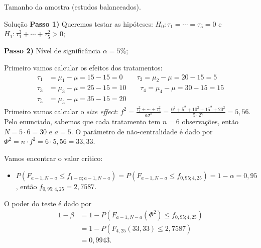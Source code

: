 \documentclass[8pt]{beamer}
\begin{document}
\begin{frame}{Tamanho da amostra (estudos balanceados).}

\small
\begin{block}{Solução}
	\textbf{Passo 1)} Queremos testar as hipóteses: $H_0: \tau_1 = \cdots = \tau_5 = 0$ e $H_1: \tau_1^2 + \cdots + \tau_5^2 > 0$;
	
	\textbf{Passo 2)} Nível de significância $\alpha=5\%$;
	
	Primeiro vamos calcular os efeitos dos tratamentos:
	\begin{align*}
	\tau_1 &= \mu_1 - \mu = 15 -15=0\qquad \tau_2 = \mu_2 - \mu = 20 -15=5\\
	\tau_3 &= \mu_3 - \mu = 25 -15=10\qquad \tau_4 = \mu_4 - \mu = 30 -15=15\\
	\tau_5 &= \mu_5 - \mu = 35 -15=20
	\end{align*}
	Primeiro vamos calcular o \textit{size effect}: $f^2 = \frac{\tau_1^2 + \cdots + \tau_5^2}{a\sigma^2} = \frac{0^2 + 5^2 + 10^2 + 15^2 + 20^2}{5 \cdot 27} = 5,56$. Pelo enunciado, sabemos que cada tratamento tem $n=6$ observações, então $N=5 \cdot 6 = 30$ e $a = 5$. O parâmetro de não-centralidade é dado por $\Phi^2 = n \cdot f^2 = 6 \cdot 5,56 = 33,33$. 
	
	Vamos encontrar o valor crítico:
	\begin{itemize}
		\item $P\left( F_{a-1, N-a} \leq f_{1-\alpha;a-1, N-a} \right) = P\left( F_{a-1, N-a} \leq f_{0,95;4, 25} \right) = 1-\alpha = 0,95$, então $f_{0,95;4, 25} = 2,7587$.
	\end{itemize}

	O poder do teste é dado por
	\begin{align*}
	1-\beta &=1 - P\left( F_{a-1, N-a}\left(\Phi^2\right) \leq  f_{0,95;4, 25} \right)\\
	&= 1 - P\left( F_{4, 25}\left(33,33\right)  \leq 2,7587 \right)\\
	&= 0,9943.
	\end{align*}
\end{block}
\normalsize

\end{frame}
\end{document}
